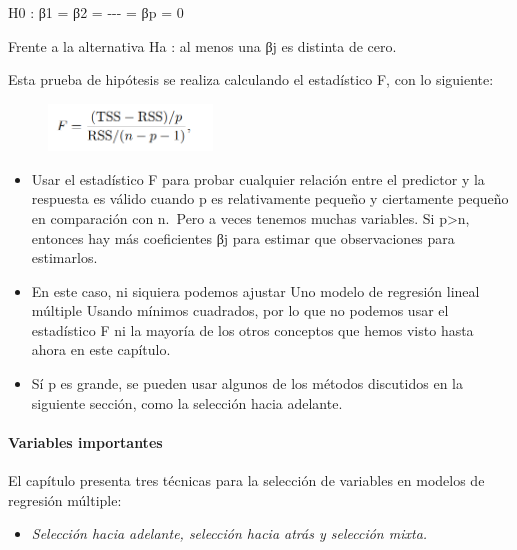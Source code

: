 \documentclass[
  letterpaper,
  DIV=11,
  numbers=noendperiod]{scrartcl}
\let\oldparagraph\paragraph
\renewcommand{\paragraph}[1]{\oldparagraph{#1}\mbox{}}
\providecommand{\tightlist}{%
  \setlength{\itemsep}{0pt}\setlength{\parskip}{0pt}}\usepackage{longtable,booktabs,array}
\begin{document}
H0 : β1 = β2 = -\/-\/- = βp = 0

Frente a la alternativa Ha : al menos una βj es distinta de cero.

Esta prueba de hipótesis se realiza calculando el estadístico F, con lo
siguiente:

\begin{figure}

{\centering \includegraphics[width=1.71875in,height=\textheight]{images/fig18.png}

}

\end{figure}

\begin{itemize}
\item
  Usar el estadístico F para probar cualquier relación entre el
  predictor y la respuesta es válido cuando p es relativamente pequeño y
  ciertamente pequeño en comparación con n.~Pero a veces tenemos muchas
  variables. Si p\textgreater n, entonces hay más coeficientes βj para
  estimar que observaciones para estimarlos.
\item
  En este caso, ni siquiera podemos ajustar Uno modelo de regresión
  lineal múltiple Usando mínimos cuadrados, por lo que no podemos usar
  el estadístico F ni la mayoría de los otros conceptos que hemos visto
  hasta ahora en este capítulo.
\item
  Sí p es grande, se pueden usar algunos de los métodos discutidos en la
  siguiente sección, como la selección hacia adelante.
\end{itemize}

\hypertarget{variables-importantes}{%
\paragraph{\texorpdfstring{\textbf{Variables
importantes}}{Variables importantes}}\label{variables-importantes}}

El capítulo presenta tres técnicas para la selección de variables en
modelos de regresión múltiple:

\begin{itemize}
\tightlist
\item
  \emph{Selección hacia adelante, selección hacia atrás y selección
  mixta.}
\end{itemize}
\end{document}
